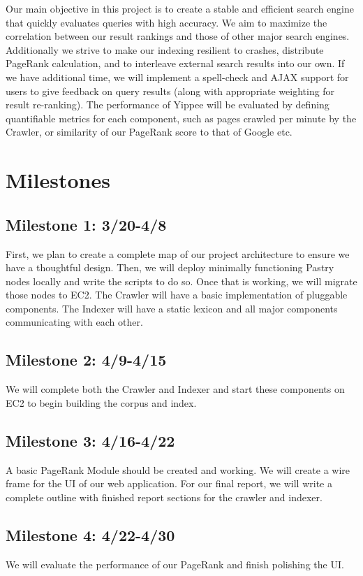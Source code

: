 \documentclass[11pt, letterpaper, oneside, twocolumn]{article}
\begin{document}
Our main objective in this project is to create a stable and efficient search engine that quickly evaluates queries with high accuracy. We aim to maximize the correlation between our result rankings and those of other major search engines. Additionally we strive to make our indexing resilient to crashes, distribute PageRank calculation, and to interleave external search results into our own. If we have additional time, we will implement a spell-check and AJAX support for users to give feedback on query results (along with appropriate weighting for result re-ranking). The performance of Yippee will be evaluated by defining quantifiable metrics for each component, such as pages crawled per minute by the Crawler, or similarity of our PageRank score to that of Google etc.

\section{ Milestones }
\label{sec:milestones}

\subsection{Milestone 1: 3/20-4/8}
First, we plan to create a complete map of our project architecture to ensure we
have a thoughtful design. Then, we will deploy minimally functioning
Pastry nodes locally and write the scripts to do so. Once that is
working, we will migrate those nodes to EC2. The Crawler will have a basic
implementation of pluggable components. The Indexer will have a static lexicon
and all major components communicating with each other. 


\subsection{Milestone 2: 4/9-4/15}
We will complete both the Crawler and Indexer and start these components on EC2
to begin building the corpus and index. 


\subsection{Milestone 3: 4/16-4/22}
A basic PageRank Module should be created and working. We will create a wire
frame for the UI of our web application. For our final report, we will write a complete outline with finished report sections for the crawler
and indexer. 


\subsection{Milestone 4: 4/22-4/30}
We will evaluate the performance of our PageRank and finish polishing the UI. 
\end{document}
